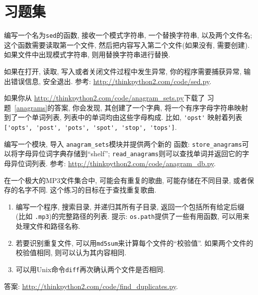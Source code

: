 \documentclass[10pt]{book}
\begin{document}
\section{习题集}

\begin{exercise}

编写一个名为{\tt sed}的函数, 接收一个模式字符串, 一个替换字符串, 以及两个文件名;
这个函数需要读取第一个文件, 然后把内容写入第二个文件(如果没有, 需要创建).
如果文件中出现模式字符串, 则用替换字符串进行替换. 

如果在打开, 读取, 写入或者关闭文件过程中发生异常, 
你的程序需要捕获异常, 输出错误信息, 安全退出. 
参考: \url{http://thinkpython2.com/code/sed.py}.

\end{exercise}


\begin{exercise}

如果你从 \url{http://thinkpython2.com/code/anagram_sets.py}下载了
习题~\ref{anagrams}的答案, 你会发现, 
其创建了一个字典, 将一个有序字母字符串映射到了一个单词列表, 
列表中的单词均由这些字母构成. 比如,
\verb"'opst'" 映射着列表
\verb"['opts', 'post', 'pots', 'spot', 'stop', 'tops']".

编写一个模块, 导入 \verb"anagram_sets"模块并提供两个新的
函数: \verb"store_anagrams"可以将字母异位词字典存储到``shelf''; 
\verb"read_anagrams"则可以查找单词并返回它的字母异位词列表. 
参考: \url{http://thinkpython2.com/code/anagram_db.py}.

\end{exercise}


\begin{exercise}
\label{checksum}

在一个极大的MP3文件集合中, 可能会有重复的歌曲, 可能存储在不同目录, 
或者保存的名字不同. 
这个练习的目标在于查找重复歌曲. 

\begin{enumerate}

\item 编写一个程序, 搜索目录, 并递归其所有子目录, 
返回一个包括所有给定后缀 (比如 {\tt .mp3})的完整路径的列表. 
提示: {\tt os.path}提供了一些有用函数, 可以用来处理文件和路径名称. 

\item 若要识别重复文件, 可以用{\tt md5sum}来计算每个文件的``校验值''. 
如果两个文件的校验值相同, 则可以认为其内容相同. 

\item 可以用Unix命令{\tt diff}再次确认两个文件是否相同. 

\end{enumerate}

答案: \url{http://thinkpython2.com/code/find_duplicates.py}.

\end{exercise}
\end{document}
